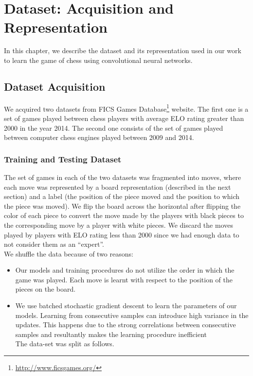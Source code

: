 \chapter{Dataset: Acquisition and Representation}
\label{chap:dataset}
In this chapter, we describe the dataset and its representation used in our 
work to learn the game of chess using convolutional neural networks.

\section{Dataset Acquisition}
We acquired two datasets from FICS Games 
Database\footnote{\url{http://www.ficsgames.org/}} website. The first 
one is a set of games played between chess players with average ELO rating 
greater than 2000 in the year 2014. The second one consists of 
the set of games played between computer chess engines played between 2009 and 
2014.
\subsection{Training and Testing Dataset}
The set of games in each of the two datasets was fragmented into moves, where 
each move was represented by a board representation (described in the next 
section) and a label (the position of the piece moved and the position to which 
the piece was moved). We flip the board across the horizontal after flipping 
the color of each piece to convert the move made by the players with black 
pieces to the corresponding move by a player with white pieces. We discard the 
moves played by players with ELO rating less than 2000 since we had enough data 
to not consider them as an ``expert''. \\
We shuffle the data because of two reasons:
\begin{itemize} 
\item Our models and training procedures do not utilize the order in which the 
game was played. Each move is learnt with respect to the position of the pieces 
on the board.
\item We use batched stochastic gradient descent to learn the parameters of our 
models. Learning from consecutive samples can introduce high variance in the 
updates. This happens due to the strong correlations between consecutive samples 
and resultantly makes the learning procedure inefficient \cite{deepmind_nips}\\
The data-set was split as follows.
\end{itemize}

